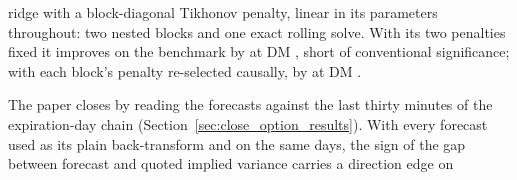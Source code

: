 ridge with a block-diagonal Tikhonov penalty, linear in its parameters
throughout: two nested blocks and one exact rolling solve. With its two
penalties fixed it improves on the benchmark by \unifBlkTwoUserDelta{} at DM
\unifBlkTwoUserDM{}, short of conventional significance; with each block's
penalty re-selected causally, by \unifBlkTwoTunedDelta{} at DM
\unifBlkTwoTunedDM{}.

The paper closes by reading the forecasts against the last thirty minutes of
the expiration-day chain (Section~\ref{sec:close_option_results}). With every
forecast used as its plain back-transform and on the same days, the sign of the
gap between forecast and quoted implied variance carries a direction edge on
